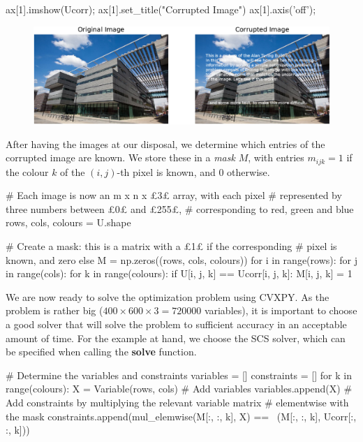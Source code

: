 \begin{example}
\begin{ipythonnb}[9]
ax[1].imshow(Ucorr);
ax[1].set_title("Corrupted Image")
ax[1].axis('off');
\end{ipythonnb}

\begin{figure}[h!]
\centering
\includegraphics[width=1\textwidth]{images/alanturing1-crop.pdf}
\end{figure}

After having the images at our disposal, we determine which entries of the corrupted image are known. We store these in a {\em mask} $M$, with entries $m_{ijk}=1$ if the colour $k$ of the $(i,j)$-th pixel is known, and $0$ otherwise.

\begin{ipythonnb}[10]
# Each image is now an m x n x £\color{cogreen}3£ array, with each pixel 
# represented by three numbers between £\color{cogreen}0£ and £\color{cogreen}255£, 
# corresponding to red, green and blue
rows, cols, colours = U.shape

# Create a mask: this is a matrix with a £\color{cogreen}1£ if the corresponding 
# pixel is known, and zero else
M = np.zeros((rows, cols, colours))
for i in range(rows):
    for j in range(cols):
        for k in range(colours):
            if U[i, j, k] == Ucorr[i, j, k]:
                M[i, j, k] = 1
\end{ipythonnb}

We are now ready to solve the optimization problem using CVXPY. As the problem is rather big ($400\times 600\times 3 = 720000$ variables), it is important to choose a good solver that will solve the problem to sufficient accuracy in an acceptable amount of time. For the example at hand, we choose the SCS solver, which can be specified when calling the \textbf{solve} function.

\begin{ipythonnb}[11]
# Determine the variables and constraints
variables = []
constraints = []
for k in range(colours):
    X = Variable(rows, cols)
    # Add variables
    variables.append(X)
    # Add constraints by multiplying the relevant variable matrix 
    # elementwise with the mask
    constraints.append(mul_elemwise(M[:, :, k], X) == 
      \ (M[:, :, k], Ucorr[:, :, k]))


\end{ipythonnb}
\end{example}
